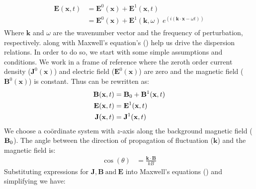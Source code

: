             \vspace{-0.4cm}
            \begin{align}
                \begin{split}
                    \mathbf{E}(\mathbf{x}, t) & = \mathbf{E}^0(\mathbf{x}) + \mathbf{E}^1(\mathbf{x}, t)\\
                    & = \mathbf{E}^0(\mathbf{x}) + \mathbf{E}^1(\mathbf{k},\omega)~e^{(i(\mathbf{k}\cdot \mathbf{x} -\omega t))}\label{eq:efl1}
                \end{split}
            \end{align}
            Where $\mathbf{k}$ and $\omega$ are the wavenumber vector and the frequency of
            perturbation, respectively.  along with Maxwell's
            equation's () help us drive the dispersion
            relations. In order to do so, we start with some simple assumptions and conditions. We
            work in a frame of reference where the zeroth order current density
            ($\mathbf{J}^0(\mathbf{x})$) and electric field ($\mathbf{E}^0(\mathbf{x})$) are zero
            and the magnetic field ($\mathbf{B}^0(\mathbf{x})$) is constant. Thus
             can be rewritten as:
            \begin{align}
                \mathbf{B}(\mathbf{x}, t) & = \mathbf{B}_{\rm 0} + \mathbf{B}^1(\mathbf{x}, t)\label{eq:mag2}\\
                \mathbf{E}(\mathbf{x}, t) & = \mathbf{E}^1(\mathbf{x}, t)\label{eq:efl2}\\
                \mathbf{J}(\mathbf{x}, t) & = \mathbf{J}^1(\mathbf{x}, t)\label{eq:curr2}
            \end{align}
            We choose a co\"ordinate system with $z$-axis along the background magnetic field
            ($\mathbf{B}_{\rm 0}$). The angle between the direction of propagation of fluctuation
            ($\mathbf{k}$) and the magnetic field is:
            \begin{align}
                \cos \left(\theta \right) & = \frac{\mathbf{k}\cdot\mathbf{B}}{k B}\label{eq:theta}
            \end{align}
            Substituting expressions for $\mathbf{J}, \mathbf{B}~\mathrm{and}~\mathbf{E}$ into
            Maxwell's equations () and simplifying we have:
